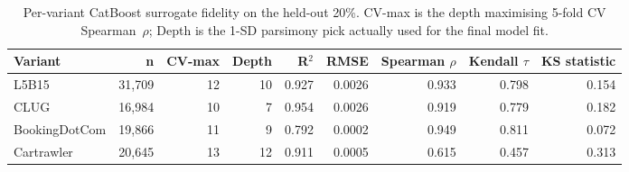 \begin{table}
\caption{Per-variant CatBoost surrogate fidelity on the held-out 20\%. CV-max is the depth maximising 5-fold CV Spearman~$\rho$; Depth is the 1-SD parsimony pick actually used for the final model fit.}
\label{tab:surrogate_fidelity_per_variant}
\begin{tabular}{lrrrrrrrr}
\toprule
Variant & n & CV-max & Depth & R$^2$ & RMSE & Spearman $\rho$ & Kendall $\tau$ & KS statistic \\
\midrule
L5B15 & 31,709 & 12 & 10 & 0.927 & 0.0026 & 0.933 & 0.798 & 0.154 \\
CLUG & 16,984 & 10 & 7 & 0.954 & 0.0026 & 0.919 & 0.779 & 0.182 \\
BookingDotCom & 19,866 & 11 & 9 & 0.792 & 0.0002 & 0.949 & 0.811 & 0.072 \\
Cartrawler & 20,645 & 13 & 12 & 0.911 & 0.0005 & 0.615 & 0.457 & 0.313 \\
\bottomrule
\end{tabular}
\end{table}
